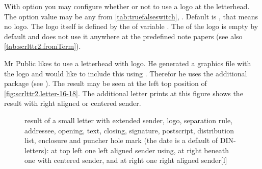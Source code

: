 \begin{Declaration}
\end{Declaration}
%
%
With option  you may configure whether or not to use a
logo at the letterhead. The option value may be any  from \autoref{tab:truefalseswitch},
. Default is , that means no
logo. The logo itself is defined by the  of variable
. The  of the logo is empty by default
and \KOMAScript{} does not use it anywhere at the predefined note papers (see
also \autoref{tab:scrlttr2.fromTerm}).%
\begin{Example}
  Mr Public likes to use a letterhead with logo. He generated a graphics file
  with the logo and would like to include this using
  . Therefor he uses the additional package
   (see \cite{package:graphics}).%
  The result may be seen at the left top position of
  \autoref{fig:scrlttr2.letter-16-18}. The additional letter prints at this
  figure shows the result with right aligned or centered sender.
  \begin{figure}
    \setcapindent{0pt}%
    {\hfill
      \quad
      \par\bigskip}
    \begin{captionbeside}
      {result of a small letter with extended sender, logo, separation rule,
        addressee, opening, text, closing, signature, postscript, distribution
        list, enclosure and puncher hole mark (the date is a default of
        DIN-letters): at top left one left aligned sender using, at right
        beneath one with centered sender, and at right one right aligned
        sender}[l]
      \quad
    \end{captionbeside}
  \label{fig:scrlttr2.letter-16-18}
  \end{figure}
\end{Example}%
%
\EndIndexGroup


